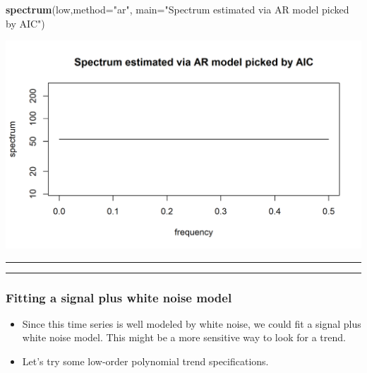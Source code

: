 \documentclass[]{article}
\newenvironment{Shaded}{\begin{snugshade}}{\end{snugshade}}
\newcommand{\KeywordTok}[1]{\textcolor[rgb]{0.13,0.29,0.53}{\textbf{#1}}}
\newcommand{\DataTypeTok}[1]{\textcolor[rgb]{0.13,0.29,0.53}{#1}}
\newcommand{\StringTok}[1]{\textcolor[rgb]{0.31,0.60,0.02}{#1}}
\newcommand{\NormalTok}[1]{#1}
\begin{document}
\begin{Shaded}
\begin{Highlighting}[]
\KeywordTok{spectrum}\NormalTok{(low,}\DataTypeTok{method=}\StringTok{"ar"}\NormalTok{, }\DataTypeTok{main=}\StringTok{"Spectrum estimated via AR model picked by AIC"}\NormalTok{)}
\end{Highlighting}
\end{Shaded}

\begin{center}\includegraphics{figure/intro-ar_periodogram-1} \end{center}

\begin{center}\rule{0.5\linewidth}{\linethickness}\end{center}

\begin{center}\rule{0.5\linewidth}{\linethickness}\end{center}

\subsubsection{Fitting a signal plus white noise
model}\label{fitting-a-signal-plus-white-noise-model}

\begin{itemize}
\item
  Since this time series is well modeled by white noise, we could fit a
  signal plus white noise model. This might be a more sensitive way to
  look for a trend.
\item
  Let's try some low-order polynomial trend specifications.
\end{itemize}
\end{document}
